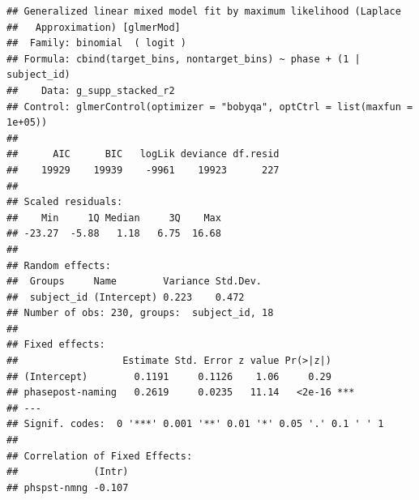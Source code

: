\documentclass[
  doc,floatsintext]{apa6}
\newenvironment{Shaded}{\begin{snugshade}}{\end{snugshade}}
\newcommand{\AttributeTok}[1]{\textcolor[rgb]{0.13,0.29,0.53}{#1}}
\newcommand{\DecValTok}[1]{\textcolor[rgb]{0.00,0.00,0.81}{#1}}
\newcommand{\FunctionTok}[1]{\textcolor[rgb]{0.13,0.29,0.53}{\textbf{#1}}}
\newcommand{\NormalTok}[1]{#1}
\newcommand{\OtherTok}[1]{\textcolor[rgb]{0.56,0.35,0.01}{#1}}
\newcommand{\SpecialCharTok}[1]{\textcolor[rgb]{0.81,0.36,0.00}{\textbf{#1}}}
\newcommand{\StringTok}[1]{\textcolor[rgb]{0.31,0.60,0.02}{#1}}
\begin{document}
\begin{Shaded}
\end{Shaded}

\begin{verbatim}
## Generalized linear mixed model fit by maximum likelihood (Laplace
##   Approximation) [glmerMod]
##  Family: binomial  ( logit )
## Formula: cbind(target_bins, nontarget_bins) ~ phase + (1 | subject_id)
##    Data: g_supp_stacked_r2
## Control: glmerControl(optimizer = "bobyqa", optCtrl = list(maxfun = 1e+05))
## 
##      AIC      BIC   logLik deviance df.resid 
##    19929    19939    -9961    19923      227 
## 
## Scaled residuals: 
##    Min     1Q Median     3Q    Max 
## -23.27  -5.88   1.18   6.75  16.68 
## 
## Random effects:
##  Groups     Name        Variance Std.Dev.
##  subject_id (Intercept) 0.223    0.472   
## Number of obs: 230, groups:  subject_id, 18
## 
## Fixed effects:
##                  Estimate Std. Error z value Pr(>|z|)    
## (Intercept)        0.1191     0.1126    1.06     0.29    
## phasepost-naming   0.2619     0.0235   11.14   <2e-16 ***
## ---
## Signif. codes:  0 '***' 0.001 '**' 0.01 '*' 0.05 '.' 0.1 ' ' 1
## 
## Correlation of Fixed Effects:
##             (Intr)
## phspst-nmng -0.107
\end{verbatim}
\end{document}

